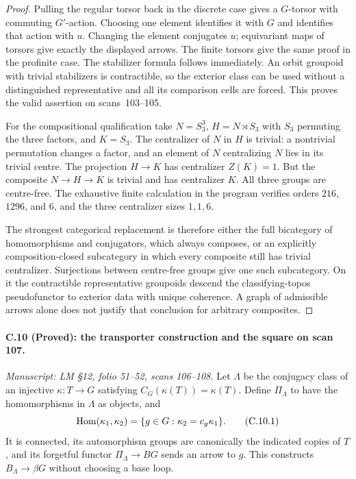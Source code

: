 \begin{proof}
Pulling the regular torsor back in the
discrete case gives a $G$-torsor with
commuting $G'$-action. Choosing one
element identifies it with $G$ and
identifies that action with $u$.
Changing the element conjugates $u$;
equivariant maps of torsors give
exactly the displayed arrows. The
finite torsors give the same proof
in the profinite case. The stabilizer
formula follows immediately. An orbit
groupoid with trivial stabilizers is
contractible, so the exterior class
can be used without a distinguished
representative and all its comparison
cells are forced. This proves the
valid assertion on scans~103--105.

For the compositional qualification
take $N=S_3^3$, $H=N\rtimes S_3$ with
$S_3$ permuting the three factors, and
$K=S_3$. The centralizer of $N$ in
$H$ is trivial: a nontrivial permutation
changes a factor, and an element of
$N$ centralizing $N$ lies in its
trivial centre. The projection
$H\to K$ has centralizer $Z(K)=1$.
But the composite $N\to H\to K$ is
trivial and has centralizer $K$.
All three groups are centre-free.
The exhaustive finite calculation in
the program verifies orders $216$,
$1296$, and $6$, and the three
centralizer sizes $1,1,6$.

The strongest categorical replacement
is therefore either the full
bicategory of homomorphisms and
conjugators, which always composes,
or an explicitly composition-closed
subcategory in which every composite
still has trivial centralizer.
Surjections between centre-free
groups give one such subcategory.
On it the contractible representative
groupoids descend the classifying-topos
pseudofunctor to exterior data with
unique coherence. A graph of admissible
arrows alone does not justify that
conclusion for arbitrary composites.
\end{proof}

\paragraph{C.10 (Proved): the transporter construction and the square on scan 107.}\label{C10}
\textit{Manuscript: LM \S12, folio 51--52, scans 106--108.}
Let $\Lambda$ be the conjugacy class of
an injective $\kappa:T\to G$ satisfying
$C_G(\kappa(T))=\kappa(T)$. Define
$\Pi_\Lambda$ to have the homomorphisms
in $\Lambda$ as objects, and
\[
 \mathrm{Hom}(\kappa_1,\kappa_2)
   =\{g\in G: \kappa_2=c_g\kappa_1\}.
                                                               \tag{C.10.1}
\]
It is connected, its automorphism
groups are canonically the indicated
copies of $T$, and its forgetful
functor $\Pi_\Lambda\to BG$ sends an
arrow to $g$. This constructs
$B_\Lambda\to\beta G$ without choosing
a base loop.

